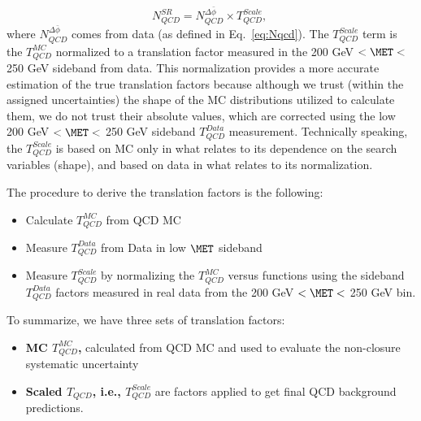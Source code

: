 \begin{equation}
N^{SR}_{QCD} = N^{\Delta\bar{\phi}}_{QCD} \times T_{QCD}^{Scale}, \;
\label{eq:QCDformula}
\end{equation}
where $N^{\Delta\bar{\phi}}_{QCD}$ comes from data (as defined in Eq.~\ref{eq:Nqcd}). The $T_{QCD}^{Scale}$ term is the
$T_{QCD}^{MC}$ normalized to a translation factor measured in the 200 GeV $<\MET<$ 250 GeV sideband from data.
This normalization provides a more accurate
estimation of the true translation factors because although we trust (within the assigned uncertainties)
the shape of the MC distributions utilized to calculate them, we do not
trust their absolute values, which are corrected using the low 
200 GeV $<\MET<$ 250 GeV sideband $T_{QCD}^{Data}$ measurement. Technically 
speaking, the $T_{QCD}^{Scale}$ is based on MC only in what relates to 
its dependence on the search variables (shape), and based on data in what
relates to its normalization.

The procedure to derive the translation factors is the following:
\begin{itemize}
\item Calculate $T_{QCD}^{MC}$ from QCD MC
\item Measure $T_{QCD}^{Data}$ from Data in low $\MET$ sideband
\item Measure $T_{QCD}^{Scale}$ by normalizing the $T_{QCD}^{MC}$ versus \MET functions using the sideband 
$T_{QCD}^{Data}$ factors measured in real data from the 
200 GeV $<\MET<$ 250 GeV bin.
\end{itemize}

To summarize, we have three sets of translation factors: 
\begin{itemize}
\item \textbf{MC $T_{QCD}^{MC}$,} calculated from QCD MC and
used to evaluate the non-closure systematic uncertainty
\item \textbf{Scaled $T_{QCD}$, i.e., $T_{QCD}^{Scale}$} are factors 
applied to get final QCD background predictions.
\end{itemize}

